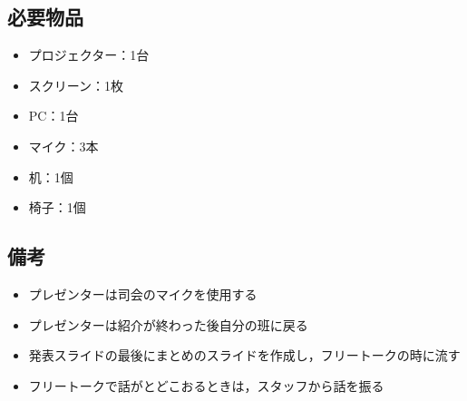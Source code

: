 \documentclass[a4j,titlepage]{jarticle}
\begin{document}
\subsection{必要物品}
 \begin{itemize}
 \item プロジェクター：1台
 \item スクリーン：1枚
 \item PC：1台
 \item マイク：3本
 \item 机：1個
 \item 椅子：1個
 \end{itemize}

\subsection{備考}
 \begin{itemize}
 \item プレゼンターは司会のマイクを使用する
 \item プレゼンターは紹介が終わった後自分の班に戻る
 \item 発表スライドの最後にまとめのスライドを作成し，フリートークの時に流す
 \item フリートークで話がとどこおるときは，スタッフから話を振る
 \end{itemize}

%
\end{document}

